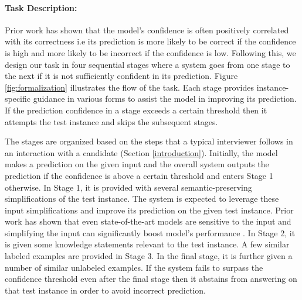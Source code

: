 \documentclass[11pt,a4paper]{article}
\begin{document}
\paragraph{Task Description:}
Prior work has shown that the model's confidence is often positively correlated with its correctness \cite{hendrycks17baseline,NIPS2017_9ef2ed4b} i.e its prediction is more likely to be correct if the confidence is high and more likely to be incorrect if the confidence is low.
Following this, we design our task in four sequential stages where a system goes from one stage to the next if it is not sufficiently confident in its prediction. Figure \ref{fig:formalization} illustrates the flow of the task. 
Each stage provides instance-specific guidance in various forms to assist the model in improving its prediction. 
If the prediction confidence in a stage exceeds a certain threshold then it attempts the test instance and skips the subsequent stages.

The stages are organized based on the steps that a typical interviewer follows in an interaction with a candidate (Section \ref{introduction}).
Initially, the model makes a prediction on the given input and the overall system outputs the prediction if the confidence is above a certain threshold and enters Stage 1 otherwise.
In Stage 1, it is provided with several semantic-preserving simplifications of the test instance.
The system is expected to leverage these input simplifications and improve its prediction on the given test instance.
Prior work has shown that even state-of-the-art models are sensitive to the input and simplifying the input can significantly boost model's performance \cite{jiang-etal-2020-know,Elazar2021MeasuringAI,anantha-etal-2021-open}.
In Stage 2, it is given some knowledge statements relevant to the test instance. 
A few similar labeled examples are provided in Stage 3.
In the final stage, it is further given a number of similar unlabeled examples. 
If the system fails to surpass the confidence threshold even after the final stage then it abstains from answering on that test instance in order to avoid incorrect prediction.
\end{document}
